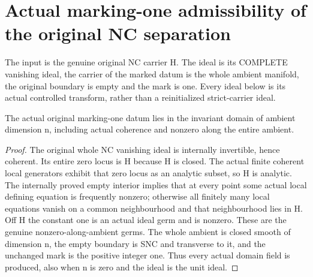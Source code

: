 \section{Actual marking-one admissibility of the original NC separation}
\label{sec:hironaka-normal-crossings-marked-admissibility}

The input is the genuine original NC carrier H. The ideal is its COMPLETE
vanishing ideal, the carrier of the marked datum is the whole ambient manifold,
the original boundary is empty and the mark is one. Every ideal below is its
actual controlled transform, rather than a reinitialized strict-carrier ideal.

\begin{lemma}
\label{hir:general-nc-original-marked-domain}
\leanok
The actual original marking-one datum lies in the invariant domain of ambient
dimension n, including actual coherence and nonzero along the entire ambient.
\end{lemma}
\begin{proof}
The original whole NC vanishing ideal is internally invertible, hence coherent.
Its entire zero locus is H because H is closed. The actual finite coherent local
generators exhibit that zero locus as an analytic subset, so H is analytic.
The internally proved empty interior implies that at every point some actual
local defining equation is frequently nonzero; otherwise all finitely many
local equations vanish on a common neighbourhood and that neighbourhood lies
in H. Off H the constant one is an actual ideal germ and is nonzero. These are
the genuine nonzero-along-ambient germs. The whole ambient is closed smooth of
dimension n, the empty boundary is SNC and transverse to it, and the unchanged
mark is the positive integer one. Thus every actual domain field is produced,
also when n is zero and the ideal is the unit ideal.
\end{proof}

